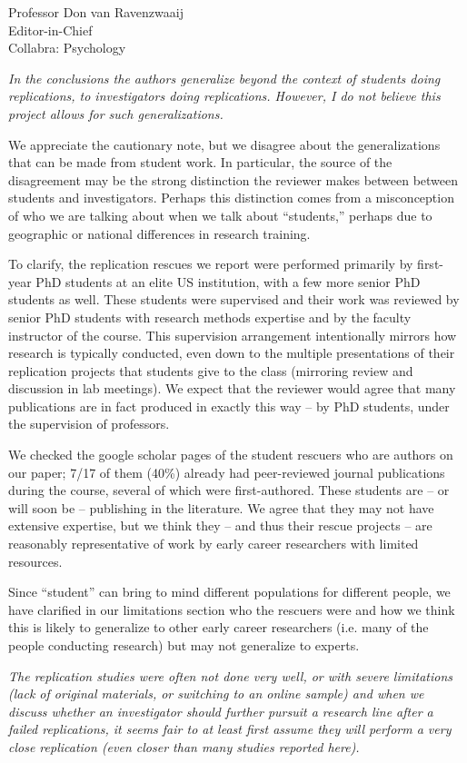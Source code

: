 \documentclass{stanfordletter}
\newcounter{section}
\newcommand{\theysaid}[1]{\begin{leftbar} \noindent 
		\textsl{ #1}\end{leftbar}}
\begin{document}
\begin{letter}{Professor Don van Ravenzwaaij \\ Editor-in-Chief \\ Collabra: Psychology }
	\theysaid{In the conclusions the authors generalize beyond the context of students doing replications, to investigators doing replications. However, I do not believe this project allows for such generalizations.} 
	
	We appreciate the cautionary note, but we disagree about the generalizations that can be made from student work. In particular, the source of the disagreement may be the strong distinction the reviewer makes between between students and investigators. Perhaps this distinction comes from a misconception of who we are talking about when we talk about ``students,'' perhaps due to geographic or national differences in research training. 
	
	To clarify, the replication rescues we report were performed primarily by first-year PhD students at an elite US institution, with a few more senior PhD students as well. These students were supervised and their work was reviewed by senior PhD students with research methods expertise and by the faculty instructor of the course. This supervision arrangement intentionally mirrors how research is typically conducted, even down to the multiple presentations of their replication projects that students give to the class (mirroring review and discussion in lab meetings). We expect that the reviewer would agree that many publications are in fact produced in exactly this way -- by PhD students, under the supervision of professors. 
	
	We checked the google scholar pages of the student rescuers who are authors on our paper; 7/17 of them (40\%) already had peer-reviewed journal publications during the course, several of which were first-authored. These students are -- or will soon be -- publishing in the literature. We agree that they may not have extensive expertise, but we think they -- and thus their rescue projects -- are reasonably representative of work by early career researchers with limited resources.
	
	Since ``student'' can bring to mind different populations for different people, we have clarified in our limitations section who the rescuers were and how we think this is likely to generalize to other early career researchers (i.e. many of the people conducting research) but may not generalize to experts. 
	
	\theysaid{The replication studies were often not done very well, or with severe limitations (lack of original materials, or switching to an online sample) and when we discuss whether an investigator should further pursuit a research line after a failed replications, it seems fair to at least first assume they will perform a very close replication (even closer than many studies reported here).}
	

\end{letter}
\end{document}
